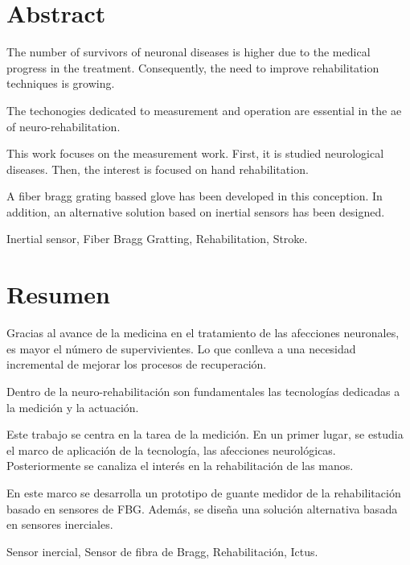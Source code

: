 \chapter*{Abstract}

\begin{abstractEn} 
The number of survivors of neuronal diseases is higher due to the medical progress in the treatment. Consequently, the need to improve rehabilitation techniques is growing.

The techonogies dedicated to measurement and operation are essential in the ae of neuro-rehabilitation.

This work focuses on the measurement work. First, it is studied neurological diseases. Then, the interest is focused on hand rehabilitation.

A fiber bragg grating bassed glove has been developed in this conception. In addition, an alternative solution based on inertial sensors has been designed.



\end{abstractEn}

\begin{keywordsEn}
Inertial sensor, Fiber Bragg Gratting, Rehabilitation, Stroke.
\end{keywordsEn}

\chapter*{Resumen}

\begin{abstractEs} Gracias al avance de la medicina en el tratamiento de las afecciones neuronales, es mayor el número de supervivientes. Lo que conlleva a una necesidad incremental de mejorar los procesos de recuperación.

Dentro de la neuro-rehabilitación son fundamentales las tecnologías dedicadas a la medición y la actuación. 

Este trabajo se centra en la tarea de la medición. En un primer lugar, se estudia el marco de aplicación de la tecnología,  las afecciones neurológicas. Posteriormente se canaliza el interés en la rehabilitación de las manos.

En este marco se desarrolla un prototipo de guante medidor de la rehabilitación basado en sensores de FBG. Además, se diseña una solución alternativa basada en sensores inerciales.




\end{abstractEs}

\begin{keywordsEs}
Sensor inercial, Sensor de fibra de Bragg, Rehabilitación, Ictus.
\end{keywordsEs}
